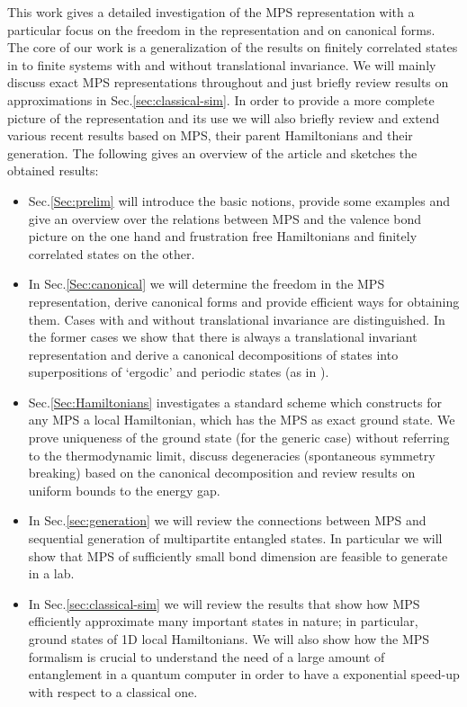 \documentclass[aps,prl,epsfig,graphics,floatfix,mathbbm,a4paper]{article}
\newcommand{\1}{\mathbbm{1}}
\renewcommand{\>}{\rangle}
\newcommand{\<}{\langle}
\begin{document}
This work gives a detailed investigation of the MPS representation
with a particular focus on the freedom in the representation and
on canonical forms. The core of our work is a generalization of
the results on finitely correlated states in \cite{FaNaWe92} to
finite systems with and without translational invariance. We will
mainly discuss exact MPS representations throughout and just
briefly review results on approximations in
Sec.\ref{sec:classical-sim}. In order to provide a more complete
picture of the representation and its use we will also briefly
review and extend various recent results based on MPS, their
parent Hamiltonians and their generation. The following gives an
overview of the article and sketches the obtained results:
\begin{itemize}
    \item Sec.\ref{Sec:prelim} will introduce the basic notions,
          provide some examples
          and give an overview over the relations between MPS and the valence bond picture on the one
          hand and frustration free Hamiltonians and finitely correlated
          states on the other.
    \item In Sec.\ref{Sec:canonical} we will determine the freedom
          in the MPS representation, derive canonical forms and provide
          efficient ways for obtaining them. Cases with and without
          translational invariance are distinguished. In the former
          cases we show that there is always a translational invariant representation and derive a canonical decompositions of states into superpositions
          of `ergodic' and periodic states (as in \cite{FaNaWe92}).
    \item Sec.\ref{Sec:Hamiltonians} investigates a standard
          scheme which constructs for any MPS a local Hamiltonian, which
          has the MPS as exact ground state. We prove uniqueness of the
          ground state (for the generic case) without referring to the
          thermodynamic limit, discuss degeneracies (spontaneous symmetry breaking) based on the canonical decomposition and review results on uniform bounds to
          the energy gap.
    \item In Sec.\ref{sec:generation} we will review the connections between MPS and
          sequential generation of multipartite entangled states. In particular we will show
          that MPS of sufficiently small bond dimension are feasible to generate in a lab.
    \item In Sec.\ref{sec:classical-sim} we will review the results that show how MPS efficiently
          approximate many important states in nature; in particular, ground states of 1D
          local Hamiltonians. We will also show how the MPS formalism is crucial to
          understand the need of a large amount of entanglement in a quantum computer in
          order to have a exponential speed-up with respect to a classical one.
\end{itemize}
\end{document}
